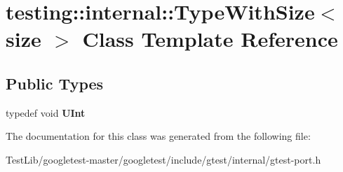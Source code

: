 \hypertarget{classtesting_1_1internal_1_1TypeWithSize}{}\section{testing\+:\+:internal\+:\+:Type\+With\+Size$<$ size $>$ Class Template Reference}
\label{classtesting_1_1internal_1_1TypeWithSize}
\subsection*{Public Types}
\begin{DoxyCompactItemize}
\item 
\mbox{\label{classtesting_1_1internal_1_1TypeWithSize_a3898640d9f6c1e18110eef90f47a5d7b}} 
typedef void {\bfseries U\+Int}
\end{DoxyCompactItemize}


The documentation for this class was generated from the following file\+:\begin{DoxyCompactItemize}
\item 
Test\+Lib/googletest-\/master/googletest/include/gtest/internal/gtest-\/port.\+h\end{DoxyCompactItemize}
